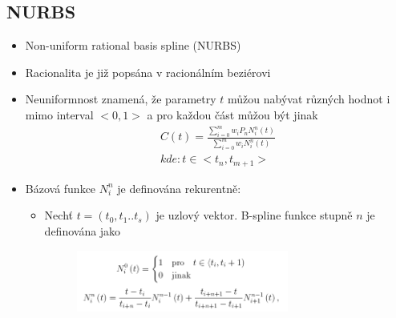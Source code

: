 \subsection{NURBS}
\begin{itemize}
	\item Non-uniform rational basis spline (NURBS)
	\item Racionalita je již popsána v racionálním beziérovi
	\item Neuniformnost znamená, že parametry $t$ můžou nabývat různých hodnot i mimo interval $<0,1>$ a pro každou část můžou být jinak 
			\begin{equation*} 
		\begin{array}{c}
			C(t) = \frac{\sum\limits_{i=0}^m w_i P_n N_i^n (t) }{\sum\limits_{i=0}^m w_i N_i^n (t)} \\ kde: t \in <t_n, t_{m+1}>
		\end{array}		
		\end{equation*}
	\item Bázová funkce $N_i^n$ je definována rekurentně:
	\begin{itemize}
		\item Nechť $t = (t_0, t_1 ..t_s)$ je uzlový vektor. B-spline funkce stupně $n$ je definována jako
		\begin{figure}[H]
		\centering
		\includegraphics[width=0.7\textwidth]{assets/3_nurbs}
		\end{figure}
	\end{itemize}
\end{itemize}